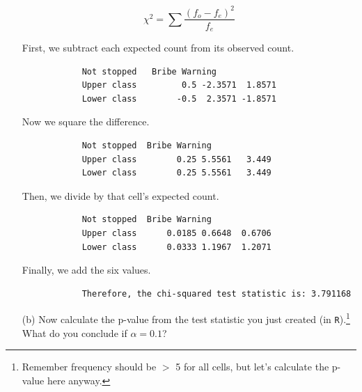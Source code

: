\documentclass[12pt,letterpaper]{article}
\begin{document}
\begin{enumerate}
		$$\chi^2 = \sum{\frac{(f_o -f_e)^2}{f_e}}$$
		
		First, we subtract each expected count from its observed count.
		
		
		
		\begin{verbatim}
			Not stopped   Bribe Warning
			Upper class         0.5 -2.3571  1.8571
			Lower class        -0.5  2.3571 -1.8571
		\end{verbatim}
		
		\vspace{.25cm}
		
		Now we square the difference. 
		
		
		
		\begin{verbatim}
			Not stopped  Bribe Warning
			Upper class        0.25 5.5561   3.449
			Lower class        0.25 5.5561   3.449
		\end{verbatim}
		
		\vspace{.25cm}
		
		Then, we divide by that cell's expected count.
		
		
		
		\begin{verbatim}
			Not stopped  Bribe Warning
			Upper class      0.0185 0.6648  0.6706
			Lower class      0.0333 1.1967  1.2071
		\end{verbatim}
		
		\vspace{.25cm}
		
		Finally, we add the six values.
		
		
		
		\begin{verbatim}
			Therefore, the chi-squared test statistic is: 3.791168
		\end{verbatim}
		
		\newpage
		\item [(b)] Now calculate the p-value from the test statistic you just created (in \texttt{R}).\footnote{Remember frequency should be $>$ 5 for all cells, but let's calculate the p-value here anyway.}  What do you conclude if $\alpha = 0.1$?\\
		

\end{enumerate}
\end{document}
